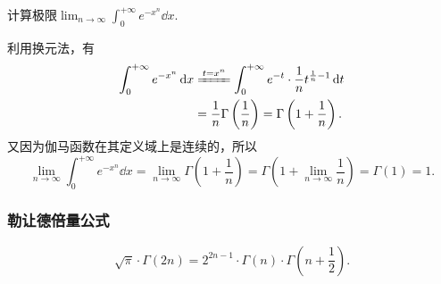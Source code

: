 \begin{example}
\def\l{\lim_{n\to\infty}}%
计算极限\(\l\int_0^{+\infty} e^{-x^n} \dd{x}\).
\begin{solution}
利用换元法，有\begin{align*}
	\int_0^{+\infty} e^{-x^n} \dd{x}
	&\xlongequal{t=x^n}
	\int_0^{+\infty} e^{-t} \cdot \frac{1}{n} t^{\frac{1}{n}-1} \dd{t} \\
	&= \frac{1}{n} \Gamma\left(\frac{1}{n}\right)
	= \Gamma\left(1+\frac{1}{n}\right).
\end{align*}
又因为伽马函数在其定义域上是连续的，所以\[
	\l\int_0^{+\infty} e^{-x^n} \dd{x}
	= \l\Gamma\left(1+\frac{1}{n}\right)
	= \Gamma\left(1+\l\frac{1}{n}\right)
	= \Gamma(1) = 1.
\]
\end{solution}
\end{example}

\subsubsection{勒让德倍量公式}
\begin{theorem}[勒让德倍量公式]
\begin{equation}\label{equation:定积分.勒让德倍量公式}
\sqrt{\pi} \cdot \Gamma(2n)
= 2^{2n-1} \cdot \Gamma(n) \cdot \Gamma\left(n+\frac{1}{2}\right).
\end{equation}
\end{theorem}

